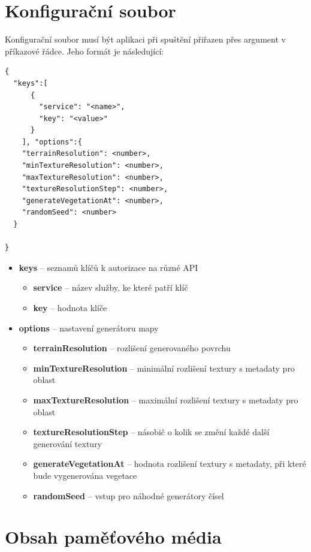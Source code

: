 \chapter{Konfigurační soubor}
Konfigurační soubor musí být aplikaci při spuštění přiřazen přes argument v příkazové řádce. Jeho formát je následující:
\begin{lstlisting}
{
  "keys":[
      {
        "service": "<name>",
        "key": "<value>"
      }
    ], "options":{
    "terrainResolution": <number>,
    "minTextureResolution": <number>,
    "maxTextureResolution": <number>,
    "textureResolutionStep": <number>,
    "generateVegetationAt": <number>,
    "randomSeed": <number>
  }

}

\end{lstlisting}
\begin{itemize}
    \item \textbf{keys} -- seznamů klíčů k autorizace na různé API
    \begin{itemize}
        \item \textbf{service} -- název služby, ke které patří klíč
        \item \textbf{key} -- hodnota klíče
    \end{itemize}
    \item \textbf{options} -- nastavení generátoru mapy
    \begin{itemize}
         \item \textbf{terrainResolution} -- rozlišení generovaného povrchu
    \item \textbf{minTextureResolution} -- minimální rozlišení textury s metadaty pro oblast
    \item \textbf{maxTextureResolution} -- maximální rozlišení textury s metadaty pro oblast
    \item \textbf{textureResolutionStep} -- násobič o kolik se změní každé další generování textury
    \item \textbf{generateVegetationAt} -- hodnota rozlišení textury s metadaty, při které bude vygenerována vegetace
    \item \textbf{randomSeed} -- vstup pro náhodné generátory čísel
    \end{itemize}
\end{itemize}


\chapter{Obsah paměťového média}

